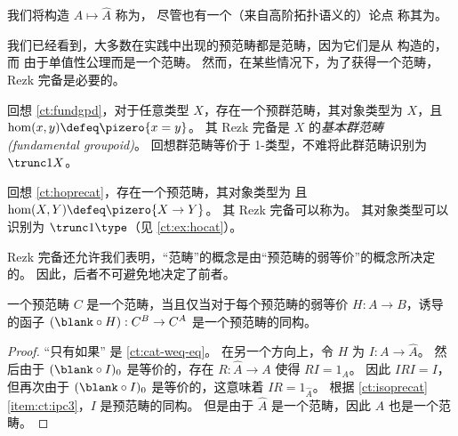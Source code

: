 我们将构造 $A\mapsto \widehat A$ 称为，
尽管也有一个（来自高阶拓扑语义的）论点
%
称其为。
%
%

我们已经看到，大多数在实践中出现的预范畴都是范畴，因为它们是从 \uset 构造的，而 \uset 由于单值性公理而是一个范畴。
然而，在某些情况下，为了获得一个范畴，Rezk 完备是必要的。

\begin{eg}\label{ct:rezk-fundgpd-trunc1}
回想 \cref{ct:fundgpd}，对于任意类型 $X$，存在一个预群范畴，其对象类型为 $X$，且 $\hom(x,y) \defeq \pizero{x=y}$。
%
%
%
其 Rezk 完备是 $X$ 的\emph{基本群范畴 (fundamental groupoid)}。
回想群范畴等价于 1-类型，不难将此群范畴识别为 $\trunc1X$。
\end{eg}

\begin{eg}\label{ct:hocat}
回想 \cref{ct:hoprecat}，存在一个预范畴，其对象类型为 \type 且 $\hom(X,Y) \defeq \pizero{X\to Y}$。
其 Rezk 完备可以称为。
%
%
其对象类型可以识别为 $\trunc1\type$（见 \cref{ct:ex:hocat}）。
\end{eg}

Rezk 完备还允许我们表明，“范畴”的概念是由“预范畴的弱等价”的概念所决定的。
因此，后者不可避免地决定了前者。

\begin{thm}\label{ct:weq-iso-precat-cat}
一个预范畴 $C$ 是一个范畴，当且仅当对于每个预范畴的弱等价 $H:A\to B$，诱导的函子 $(\blank\circ H):C^B \to C^A$ 是一个预范畴的同构。
\end{thm}
\begin{proof}
  “只有如果” 是 \cref{ct:cat-weq-eq}。
  在另一个方向上，令 $H$ 为 $I:A\to\widehat A$。
  然后由于 $(\blank\circ I)_0$ 是等价的，存在 $R:\widehat A\to A$ 使得 $RI=1_A$。
  因此 $IRI=I$，但再次由于 $(\blank\circ I)_0$ 是等价的，这意味着 $IR =1_{\widehat A}$。
  根据 \cref{ct:isoprecat}\ref{item:ct:ipc3}，$I$ 是预范畴的同构。
  但是由于 $\widehat A$ 是一个范畴，因此 $A$ 也是一个范畴。
\end{proof}

%


\newpage

\sectionNotes


